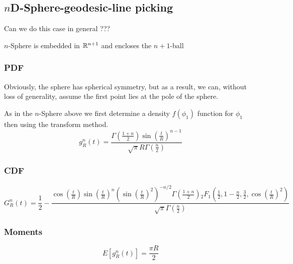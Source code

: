 \subsection{$n$D-Sphere-geodesic-line picking}
\label{sec:nsphere_geodesic_line}

Can we do this case in general ???

$n$-Sphere is embedded in $\mathbb{R}^{n+1}$ and encloses the $n+1$-ball

\subsubsection{PDF}

Obviously, the sphere has spherical symmetry, but as a result, we can,
without loss of generality, assume the first point lies at the pole of
the sphere.

As in the $n$-Sphere above we first determine a density $f(\phi_1)$ function for $\phi_1$ then using the transform method.
\begin{equation}
g_{R}^{n}(t)=\frac{\Gamma\left(\frac{1+n}{2}\right) \sin\left(\frac{t}{R}\right)^{n-1}}{\sqrt{\pi } R \Gamma\left(\frac{n}{2}\right)}
\end{equation}

\subsubsection{CDF}
\begin{equation}
G_{R}^{n}(t)=\frac{1}{2}-\frac{\cos\left(\frac{t}{R}\right) \sin\left(\frac{t}{R}\right)^n \left(\sin\left(\frac{t}{R}\right)^2\right)^{-n/2}\Gamma\left(\frac{1+n}{2}\right) {}_{2}F_{1}\left(\frac{1}{2},1-\frac{n}{2},\frac{3}{2},\cos\left(\frac{t}{R}\right)^2\right) }  {\sqrt{\pi } \Gamma\left(\frac{n}{2}\right)}
\end{equation}

\subsubsection{Moments}

\begin{equation}
E[g_{R}^{n}(t)]=\frac{\pi R}{2}
\end{equation}




